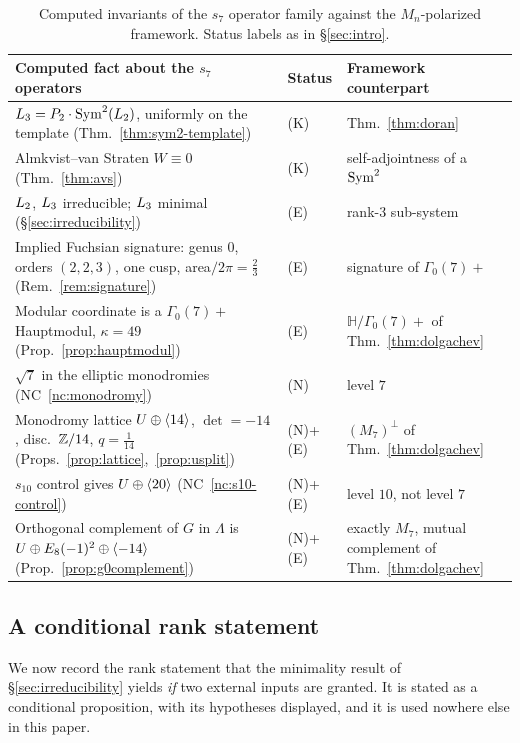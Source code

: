 \begin{table}[htbp]
\centering
\begin{tabular}{@{}p{}ll@{}}
\toprule
\textbf{Computed fact about the $s_7$ operators} & \textbf{Status} &
\textbf{Framework counterpart} \\
\midrule
$L_3 = P_2\cdot\operatorname{Sym}^2(L_2)$, uniformly on the template
  (Thm.~\ref{thm:sym2-template}) & (K) & Thm.~\ref{thm:doran} \\
Almkvist--van Straten $W\equiv0$ (Thm.~\ref{thm:avs}) & (K) &
  self-adjointness of a $\operatorname{Sym}^2$ \\
$L_2$, $L_3$ irreducible; $L_3$ minimal
  (\S\ref{sec:irreducibility}) & (E) & rank-3 sub-system \\
Implied Fuchsian signature: genus $0$, orders $(2,2,3)$, one cusp,
  area$/2\pi = \tfrac23$ (Rem.~\ref{rem:signature}) & (E) &
  signature of $\Gamma_0(7)+$ \\
Modular coordinate is a $\Gamma_0(7)+$ Hauptmodul, $\kappa = 49$
  (Prop.~\ref{prop:hauptmodul}) & (E) & $\mathbb{H}/\Gamma_0(7)+$ of
  Thm.~\ref{thm:dolgachev} \\
$\sqrt7$ in the elliptic monodromies (NC~\ref{nc:monodromy}) & (N) &
  level $7$ \\
Monodromy lattice $U\oplus\langle 14\rangle$, $\det = -14$, disc.\ $\mathbb{Z}/14$,
  $q = \tfrac1{14}$ (Props.~\ref{prop:lattice},~\ref{prop:usplit}) & (N)+(E) &
  $(M_7)^{\perp}$ of Thm.~\ref{thm:dolgachev} \\
$s_{10}$ control gives $U\oplus\langle 20\rangle$ (NC~\ref{nc:s10-control}) & (N)+(E) &
  level $10$, not level $7$ \\
Orthogonal complement of $G$ in $\Lambda$ is
  $U\oplus E_8(-1)^2\oplus\langle -14\rangle$ (Prop.~\ref{prop:g0complement}) & (N)+(E) &
  exactly $M_7$, mutual complement of Thm.~\ref{thm:dolgachev} \\
\bottomrule
\end{tabular}
\medskip
\caption{Computed invariants of the $s_7$ operator family against the
$M_n$-polarized framework. Status labels as in \S\ref{sec:intro}.}
\label{tab:evidence}
\end{table}

\subsection{A conditional rank statement}

We now record the rank statement that the minimality result of
\S\ref{sec:irreducibility} yields \emph{if} two external inputs are granted.
It is stated as a conditional proposition, with its hypotheses displayed, and
it is used nowhere else in this paper.

